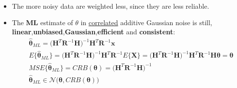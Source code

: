 \begin{itemize}
        \[
\mathbf{R} =
\begin{bmatrix}
\sigma_0^{2} & 0 & \cdots & 0 \\
0 & \sigma_1^{2} & \cdots & 0 \\
\vdots & \vdots & \ddots & \vdots \\
0 & 0 & \cdots & \sigma_{N-1}^{2}
\end{bmatrix}
\;\Rightarrow\;
\mathbf{W} = \mathbf{R}^{-1} =
\begin{bmatrix}
1/\sigma_0^{2} & 0 & \cdots & 0 \\
0 & 1/\sigma_1^{2} & \cdots & 0 \\
\vdots & \vdots & \ddots & \vdots \\
0 & 0 & \cdots & 1/\sigma_{N-1}^{2}
\end{bmatrix}
\]
\[
\hat{\boldsymbol{\theta}}_{WLS}
= \arg\min_{\boldsymbol{\theta}}
(\mathbf{x}-\mathbf{H}\boldsymbol{\theta})^{T}
\mathbf{W}
(\mathbf{x}-\mathbf{H}\boldsymbol{\theta})
= \arg\min_{\boldsymbol{\theta}}
\sum_{k=0}^{N-1}
\frac{1}{\sigma_k^{2}}
\left(
x_k - \sum_{i=1}^{p}\theta_i h_{i,k}
\right)^{2}
\]
    \item The more noisy data are weighted less, since they are less reliable.
    \item The \textbf{ML} estimate of \(\theta\) in \underline{correlated} additive Gaussian noise is still, \textbf{linear},\textbf{unbiased},\textbf{Gaussian},\textbf{efficient} and \textbf{consistent}:
\begin{align*}
&\hat{\boldsymbol{\theta}}_{ML}
= \big(\mathbf{H}^{T}\mathbf{R}^{-1}\mathbf{H}\big)^{-1}
  \mathbf{H}^{T}\mathbf{R}^{-1}\mathbf{x}\\[3pt]
&E\{\hat{\boldsymbol{\theta}}_{ML}\}
= \big(\mathbf{H}^{T}\mathbf{R}^{-1}\mathbf{H}\big)^{-1}
  \mathbf{H}^{T}\mathbf{R}^{-1}E\{\mathbf{X}\}
= \big(\mathbf{H}^{T}\mathbf{R}^{-1}\mathbf{H}\big)^{-1}
  \mathbf{H}^{T}\mathbf{R}^{-1}\mathbf{H}\boldsymbol{\theta}
= \boldsymbol{\theta}\\[3pt]
&MSE\{\hat{\boldsymbol{\theta}}_{ML}\}
= CRB(\boldsymbol{\theta})
= \big(\mathbf{H}^{T}\mathbf{R}^{-1}\mathbf{H}\big)^{-1}\\[3pt]
&\hat{\boldsymbol{\theta}}_{ML}
\in \mathcal{N}\big(\boldsymbol{\theta},CRB(\boldsymbol{\theta})\big)
\end{align*}


\end{itemize}

